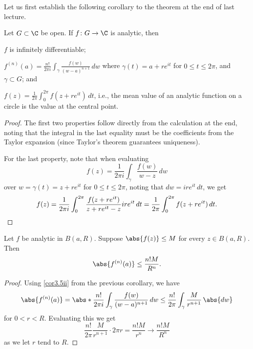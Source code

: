 


Let us first establish the following corollary to the theorem at the end of last lecture.

\begin{corollary}\label{cor3.5}
	Let $G \subset \C$ be open.
	If $f \colon G \to \C$ is analytic, then
	\begin{items}
		\item $f$ is infinitely differentiable;
		\item\label{cor3.5ii} $\displaystyle f^{(n)}(a) = \frac{n!}{2 \pi i} \int_\gamma \frac{f(w)}{(w - a)^{n + 1}} \, d w$ where $\gamma(t) = a + r e^{i t}$ for $0 \leq t \leq 2 \pi$, and $\gamma \subset G$; and
		\item $\displaystyle f(z) = \frac{1}{2 \pi} \int_0^{2 \pi} f(z + r e^{i t}) \, d t$, i.e., the mean value of an analytic function on a circle is the value at the central point.
	\end{items}
\end{corollary}

\begin{proof}
	The first two properties follow directly from the calculation at the end, noting that the integral in the last equality must be the coefficients from the Taylor expansion (since Taylor's theorem guarantees uniqueness).

	For the last property, note that when evaluating
	\[
		f(z) = \frac{1}{2 \pi i} \int_\gamma \frac{f(w)}{w - z} \, d w
	\]
	over $w = \gamma(t) = z + r e^{i t}$ for $0 \leq t \leq 2 \pi$, noting that $d w = i r e^{i t} \, d t$, we get
	\[
		f(z) = \frac{1}{2 \pi i} \int_0^{2 \pi} \frac{f(z + r e^{i t})}{z + r e^{i t} - z} i r e^{i t} \, d t = \frac{1}{2 \pi} \int_0^{2 \pi} f(z + r e^{i t}) \, d t. \qedhere
	\]
\end{proof}

\begin{corollary}\label{cor3.6}
	Let $f$ be analytic in $B(a, R)$.
	Suppose $\abs{f(z)} \leq M$ for every $z \in B(a, R)$.
	Then
	\[
		\abs{f^{(n)}(a)} \leq \frac{n! M}{R^n}.
	\]
\end{corollary}

\begin{proof}
	Using \ref{cor3.5ii} from the previous corollary, we have
	\[
		\abs{f^{(n)}(a)} = \abs*{ \frac{n!}{2 \pi i} \int_\gamma \frac{f(w)}{(w - a)^{n + 1}} \, d w} \leq \frac{n!}{2 \pi} \int_\gamma \frac{M}{r^{n + 1}} \, \abs{d w}
	\]
	for $0 < r < R$.
	Evaluating this we get
	\[
		\frac{n!}{2 \pi} \frac{M}{r^{n + 1}} \cdot 2 \pi r = \frac{n! M}{r^n} \to \frac{n! M}{R^n}
	\]
	as we let $r$ tend to $R$.
\end{proof}

